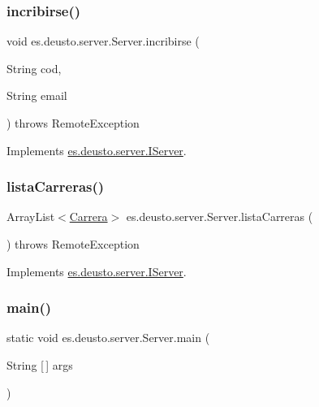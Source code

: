 \subsubsection{\texorpdfstring{incribirse()}{incribirse()}}
{\footnotesize\ttfamily void es.\+deusto.\+server.\+Server.\+incribirse (\begin{DoxyParamCaption}\item[{String}]{cod,  }\item[{String}]{email }\end{DoxyParamCaption}) throws Remote\+Exception}



Implements \mbox{\hyperlink{interfacees_1_1deusto_1_1server_1_1_i_server_ab6f6b6b646a79a330ab0b2174d77db44}{es.\+deusto.\+server.\+I\+Server}}.

\mbox{\label{classes_1_1deusto_1_1server_1_1_server_af62ce3462ec30a081db0009d2f2b33bb}} 
\subsubsection{\texorpdfstring{listaCarreras()}{listaCarreras()}}
{\footnotesize\ttfamily Array\+List$<$\mbox{\hyperlink{classes_1_1deusto_1_1server_1_1jdo_1_1_carrera}{Carrera}}$>$ es.\+deusto.\+server.\+Server.\+lista\+Carreras (\begin{DoxyParamCaption}{ }\end{DoxyParamCaption}) throws Remote\+Exception}



Implements \mbox{\hyperlink{interfacees_1_1deusto_1_1server_1_1_i_server_a13c17b07c8114d16130053aecdd455bb}{es.\+deusto.\+server.\+I\+Server}}.

\mbox{\label{classes_1_1deusto_1_1server_1_1_server_a750bb0d7dbd89246a3602f2e20d03fb5}} 
\subsubsection{\texorpdfstring{main()}{main()}}
{\footnotesize\ttfamily static void es.\+deusto.\+server.\+Server.\+main (\begin{DoxyParamCaption}\item[{String \mbox{[}$\,$\mbox{]}}]{args }\end{DoxyParamCaption})\hspace{0.3cm}{\ttfamily [static]}}

